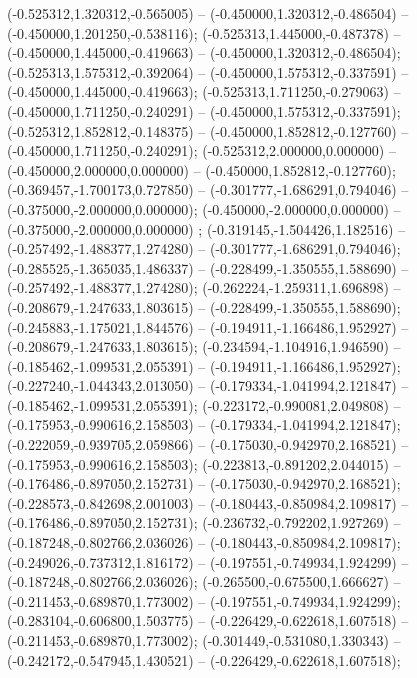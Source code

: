  (-0.525312,1.320312,-0.565005) -- (-0.450000,1.320312,-0.486504) -- (-0.450000,1.201250,-0.538116);
 (-0.525313,1.445000,-0.487378) -- (-0.450000,1.445000,-0.419663) -- (-0.450000,1.320312,-0.486504);
 (-0.525313,1.575312,-0.392064) -- (-0.450000,1.575312,-0.337591) -- (-0.450000,1.445000,-0.419663);
 (-0.525313,1.711250,-0.279063) -- (-0.450000,1.711250,-0.240291) -- (-0.450000,1.575312,-0.337591);
 (-0.525312,1.852812,-0.148375) -- (-0.450000,1.852812,-0.127760) -- (-0.450000,1.711250,-0.240291);
 (-0.525312,2.000000,0.000000) -- (-0.450000,2.000000,0.000000) -- (-0.450000,1.852812,-0.127760);
 (-0.369457,-1.700173,0.727850) -- (-0.301777,-1.686291,0.794046) -- (-0.375000,-2.000000,0.000000);
 (-0.450000,-2.000000,0.000000) -- (-0.375000,-2.000000,0.000000) ;
 (-0.319145,-1.504426,1.182516) -- (-0.257492,-1.488377,1.274280) -- (-0.301777,-1.686291,0.794046);
 (-0.285525,-1.365035,1.486337) -- (-0.228499,-1.350555,1.588690) -- (-0.257492,-1.488377,1.274280);
 (-0.262224,-1.259311,1.696898) -- (-0.208679,-1.247633,1.803615) -- (-0.228499,-1.350555,1.588690);
 (-0.245883,-1.175021,1.844576) -- (-0.194911,-1.166486,1.952927) -- (-0.208679,-1.247633,1.803615);
 (-0.234594,-1.104916,1.946590) -- (-0.185462,-1.099531,2.055391) -- (-0.194911,-1.166486,1.952927);
 (-0.227240,-1.044343,2.013050) -- (-0.179334,-1.041994,2.121847) -- (-0.185462,-1.099531,2.055391);
 (-0.223172,-0.990081,2.049808) -- (-0.175953,-0.990616,2.158503) -- (-0.179334,-1.041994,2.121847);
 (-0.222059,-0.939705,2.059866) -- (-0.175030,-0.942970,2.168521) -- (-0.175953,-0.990616,2.158503);
 (-0.223813,-0.891202,2.044015) -- (-0.176486,-0.897050,2.152731) -- (-0.175030,-0.942970,2.168521);
 (-0.228573,-0.842698,2.001003) -- (-0.180443,-0.850984,2.109817) -- (-0.176486,-0.897050,2.152731);
 (-0.236732,-0.792202,1.927269) -- (-0.187248,-0.802766,2.036026) -- (-0.180443,-0.850984,2.109817);
 (-0.249026,-0.737312,1.816172) -- (-0.197551,-0.749934,1.924299) -- (-0.187248,-0.802766,2.036026);
 (-0.265500,-0.675500,1.666627) -- (-0.211453,-0.689870,1.773002) -- (-0.197551,-0.749934,1.924299);
 (-0.283104,-0.606800,1.503775) -- (-0.226429,-0.622618,1.607518) -- (-0.211453,-0.689870,1.773002);
 (-0.301449,-0.531080,1.330343) -- (-0.242172,-0.547945,1.430521) -- (-0.226429,-0.622618,1.607518);
